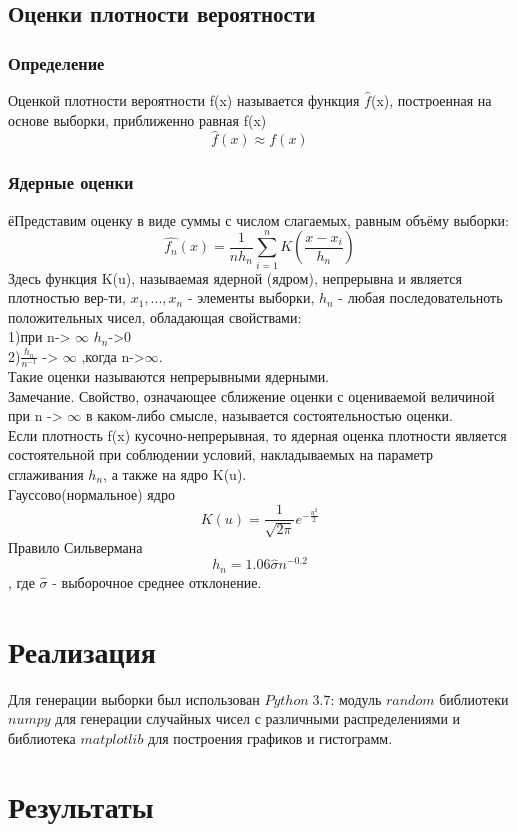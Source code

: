 \documentclass[a4]{article}
\begin{document}
			\subsection{Оценки плотности вероятности}
			\subsubsection{Определение}
			Оценкой плотности вероятности f(x) называется функция $\hat{f}$(x), построенная на основе выборки, приближенно равная f(x) $$\hat{f}(x) \approx f(x)$$
			\subsubsection{Ядерные оценки}
			ёПредставим оценку в виде суммы с числом слагаемых, равным объёму выборки: 
			$$\hat{f_n}(x) = \frac{1}{n h_n} \sum_{i = 1}^{n} K(\frac{x - x_i}{h_n})$$
			Здесь функция K(u), называемая ядерной (ядром), непрерывна и является плотностью вер-ти, $x_1, ..., x_n$ - элементы выборки, {$h_n$} - любая последовательноть положительных чисел, обладающая свойствами:\\
			1)при n-> $\infty$ $h_n$->0\\
			2)$\frac{h_n}{n^{-1}}$ -> $\infty$ ,когда n->$\infty$.\\
			Такие оценки называются непрерывными ядерными.\\
			
			Замечание. Свойство, означающее сближение оценки с оцениваемой величиной при n -> $\infty$ в каком-либо смысле, называется состоятельностью оценки.\\
			Если плотность f(x) кусочно-непрерывная, то ядерная оценка плотности
			является состоятельной при соблюдении условий, накладываемых на параметр сглаживания $h_n$, а также на ядро K(u).\\
			Гауссово(нормальное) ядро$$K(u) = \frac{1}{\sqrt{2 \pi}} e^{-\frac{u^2}{2}}$$
			Правило Сильвермана
			$$h_n = 1.06 \hat{\sigma} n^{-0.2}$$, где $\hat{\sigma}$ - выборочное среднее отклонение.
				
	\section{Реализация}
	Для генерации выборки был использован $Python\;3.7$: модуль $random$ библиотеки $numpy$ для генерации случайных чисел с различными распределениями и библиотека $matplotlib$ для построения графиков и гистограмм.
	\newpage
	\section{Результаты}
\end{document}
